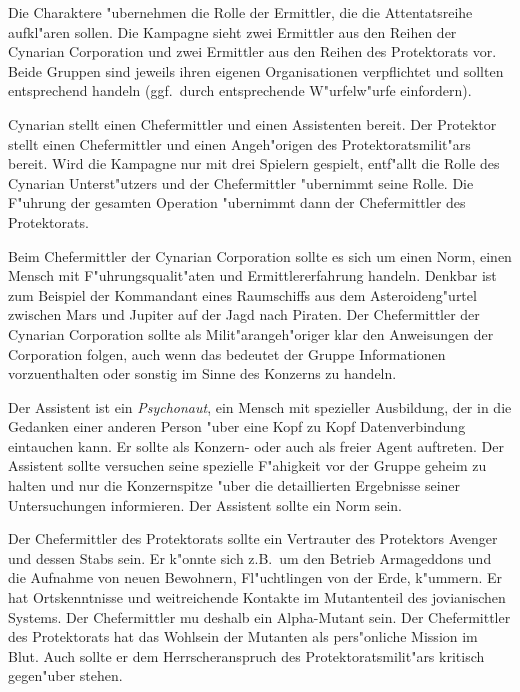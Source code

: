 
Die Charaktere "ubernehmen die Rolle der Ermittler, die die Attentatsreihe aufkl"aren sollen. Die Kampagne sieht zwei Ermittler aus den Reihen der Cynarian Corporation und zwei Ermittler aus den Reihen des Protektorats vor. Beide Gruppen sind jeweils ihren eigenen Organisationen verpflichtet und sollten entsprechend handeln (ggf.~durch entsprechende W"urfelw"urfe einfordern).

Cynarian stellt einen Chefermittler und einen Assistenten bereit. Der Protektor stellt einen Chefermittler und einen Angeh"origen des Protektoratsmilit"ars bereit. Wird die Kampagne nur mit drei Spielern gespielt, entf"allt die Rolle des Cynarian Unterst"utzers und der Chefermittler "ubernimmt seine Rolle. Die F"uhrung der gesamten Operation "ubernimmt dann der Chefermittler des Protektorats. 

Beim Chefermittler der Cynarian Corporation sollte es sich um einen Norm, einen Mensch mit F"uhrungsqualit"aten und Ermittlererfahrung handeln. Denkbar ist zum Beispiel der Kommandant eines Raumschiffs aus dem Asteroideng"urtel zwischen Mars und Jupiter auf der Jagd nach Piraten. Der Chefermittler der Cynarian Corporation sollte als Milit"arangeh"origer klar den Anweisungen der Corporation folgen, auch wenn das bedeutet der Gruppe Informationen vorzuenthalten oder sonstig im Sinne des Konzerns zu handeln.

Der Assistent ist ein \emph{Psychonaut}, ein Mensch mit spezieller Ausbildung, der in die Gedanken einer anderen Person "uber eine Kopf zu Kopf Datenverbindung eintauchen kann. Er sollte als Konzern- oder auch als freier Agent auftreten. Der Assistent sollte versuchen seine spezielle F"ahigkeit vor der Gruppe geheim zu halten und nur die Konzernspitze "uber die detaillierten Ergebnisse seiner Untersuchungen informieren. Der Assistent sollte ein Norm sein.

Der Chefermittler des Protektorats sollte ein Vertrauter des Protektors Avenger und dessen Stabs sein. Er k"onnte sich z.B.~um den Betrieb Armageddons und die Aufnahme von neuen Bewohnern, Fl"uchtlingen von der Erde, k"ummern. Er hat Ortskenntnisse und weitreichende Kontakte im Mutantenteil des jovianischen Systems. Der Chefermittler mu\3 deshalb ein Alpha-Mutant sein. Der Chefermittler des Protektorats hat das Wohlsein der Mutanten als pers"onliche Mission im Blut. Auch sollte er dem Herrscheranspruch des Protektoratsmilit"ars kritisch gegen"uber stehen.

